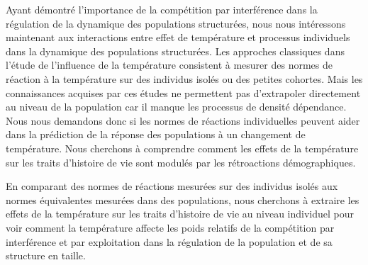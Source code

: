 Ayant démontré l'importance de la compétition par interférence dans la
régulation de la dynamique des populations structurées, nous nous intéressons
maintenant aux interactions entre effet de température et processus individuels
dans la dynamique des populations structurées. Les approches classiques dans
l'étude de l'influence de la température consistent à mesurer des normes de
réaction à la température sur des individus isolés ou des petites cohortes. Mais
les connaissances acquises par ces études ne permettent pas d'extrapoler
directement au niveau de la population car il manque les processus de densité
dépendance. Nous nous demandons donc si les normes de réactions individuelles
peuvent aider dans la prédiction de la réponse des populations à un changement
de température. Nous cherchons à comprendre comment les effets de la température
sur les traits d'histoire de vie sont modulés par les rétroactions
démographiques.

En comparant des normes de réactions mesurées sur des individus isolés aux
normes équivalentes mesurées dans des populations, nous cherchons à extraire les
effets de la température sur les traits d'histoire de vie au niveau individuel
pour voir comment la température affecte les poids relatifs de la compétition
par interférence et par exploitation dans la régulation de la population et de
sa structure en taille.

